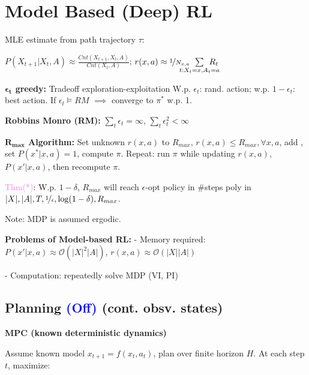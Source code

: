 \section{Model Based (Deep) RL}


MLE estimate from path trajectory $\tau$:

{\fontsize{9.7}{6}\selectfont $P(X_{t+1} | X_t, A) \approx \frac{Cnt(X_{t+1}, X_t, A)}{Cnt(X_t, A)}$;
$r(x,a) \approx \nicefrac{1}{N_{x,a}} \hspace*{-5mm} \sum\limits_{t: X_t = x, A_t = a} \hspace*{-5mm} R_t$}

\textbf{$\mathbf{\epsilon_t}$ greedy:} Tradeoff exploration-exploitation
W.p. $\epsilon_t$: rand. action; w.p. $1 - \epsilon_t$: best action.
If $\epsilon_t \vDash RM$ $\implies$ converge to $\pi^*$ w.p. 1.

\textbf{Robbins Monro (RM):} $\sum_t \epsilon_t = \infty$, $\sum_t \epsilon_t^2 < \infty$

\textbf{$\mathbf{R_{max}}$ Algorithm:} Set unknown $r(x,a)$ to $R_{max}$, $r(x,a) \leq R_{max}, \forall x,a$, add , set $P(x^* | x,a) = 1$, compute $\pi$. Repeat: run $\pi$ while updating $r(x,a)$, $P(x' | x,a)$, then recompute $\pi$.

\textcolor{violet}{Thm(*)}: W.p. $1 - \delta$, $R_{max}$ will reach $\epsilon$-opt policy in \#steps poly in $|X|, |A|, T, \nicefrac{1}{\epsilon}, \log(1 - \delta), R_{max}$.

Note: MDP is assumed ergodic.

\textbf{Problems of Model-based RL:} - Memory required: $P(x'|x,a) \approx \mathcal{O}(|X|^2 |A|)$, $r(x,a) \approx \mathcal{O}(|X||A|)$

- Computation: repeatedly solve MDP (VI, PI)


\subsection*{Planning \textcolor{blue}{\textnormal{(Off)}} \textcolor{myblue}{\textnormal{(cont. obsv. states)}}}

\textbf{MPC (known deterministic dynamics)}

Assume known model $x_{t+1} = f(x_t, a_t)$, plan over finite horizon $H$. At each step $t$, maximize:

